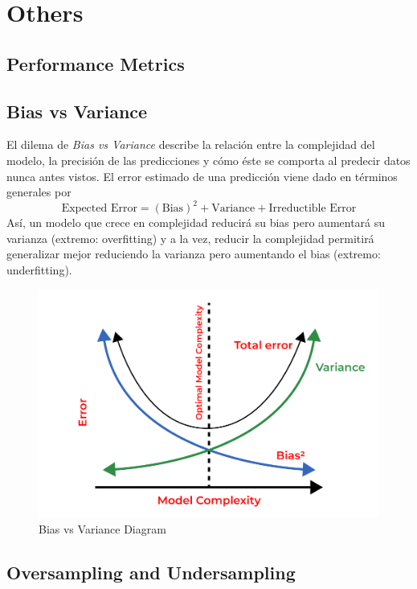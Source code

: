 \section{Others}

\subsection{Performance Metrics} 

\subsection{Bias vs Variance}

El dilema de \textit{Bias vs Variance} describe la relación entre la complejidad del modelo, la precisión de las predicciones y cómo éste se comporta al predecir datos nunca antes vistos. El error estimado de una predicción viene dado en términos generales por 
$$
\text{Expected Error} = (\text{Bias})^2 + \text{Variance} + \text{Irreductible Error}
$$
Así, un modelo que crece en complejidad reducirá su bias pero aumentará su varianza (extremo: overfitting) y a la vez, reducir la complejidad permitirá generalizar mejor reduciendo la varianza pero aumentando el bias (extremo: underfitting). 

\begin{figure}[H]
    \center
    \includegraphics[scale=0.3]{notebooks/Others/img/bias_vs_variance.png}
    \caption{Bias vs Variance Diagram}
\end{figure}

\subsection{Oversampling and Undersampling}

